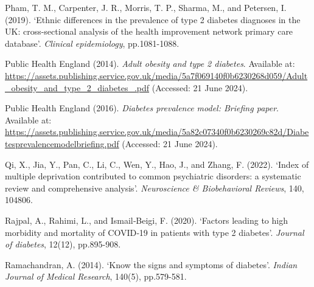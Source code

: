 \begin{Reference}
\begin{flushleft}
Pham, T. M., Carpenter, J. R., Morris, T. P., Sharma, M., and Petersen, I. (2019). `Ethnic differences in the prevalence of type 2 diabetes diagnoses in the UK: cross-sectional analysis of the health improvement network primary care database'. \textit{Clinical epidemiology}, pp.1081-1088.
\end{flushleft}
\vspace{2pt}


\begin{flushleft}
Public Health England (2014). \textit{Adult obesity and type 2 diabetes}. Available at: \url{https://assets.publishing.service.gov.uk/media/5a7f069140f0b6230268d059/Adult_obesity_and_type_2_diabetes_.pdf} (Accessed: 21 June 2024).
\end{flushleft}
\vspace{2pt}


\begin{flushleft}
Public Health England (2016). \textit{Diabetes prevalence model: Briefing paper}. Available at: \url{https://assets.publishing.service.gov.uk/media/5a82c07340f0b6230269c82d/Diabetesprevalencemodelbriefing.pdf} (Accessed: 21 June 2024).
\end{flushleft}
\vspace{2pt}


\begin{flushleft}
Qi, X., Jia, Y., Pan, C., Li, C., Wen, Y., Hao, J., and Zhang, F. (2022). `Index of multiple deprivation contributed to common psychiatric disorders: a systematic review and comprehensive analysis'. \textit{Neuroscience \& Biobehavioral Reviews}, 140, 104806.
\end{flushleft}
\vspace{2pt}


\begin{flushleft}
Rajpal, A., Rahimi, L., and Ismail‐Beigi, F. (2020). `Factors leading to high morbidity and mortality of COVID‐19 in patients with type 2 diabetes'. \textit{Journal of diabetes}, 12(12), pp.895-908.
\end{flushleft}
\vspace{2pt}


\begin{flushleft}
Ramachandran, A. (2014). `Know the signs and symptoms of diabetes'. \textit{Indian Journal of Medical Research}, 140(5), pp.579-581.
\end{flushleft}
\vspace{2pt}



\end{Reference}
